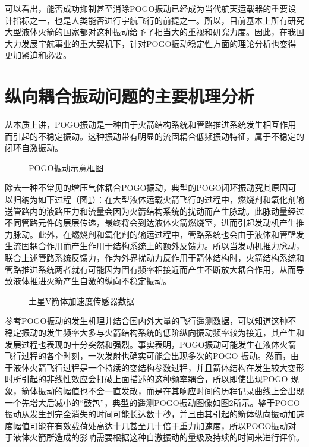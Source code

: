 可以看出，能否成功抑制甚至消除POGO振动已经成为当代航天运载器的重要设计指标之一，也是人类能否进行宇航飞行的前提之一。所以，目前基本上所有研究大型液体火箭的国家都对这种振动给予了相当大的重视和研究力度。因此，在我国大力发展宇航事业的重大契机下，针对POGO振动稳定性方面的理论分析也变得更加紧迫和必要。

\section{纵向耦合振动问题的主要机理分析}
\label{sec:POGO_Mechanicsm}
从本质上讲，POGO振动是一种由于火箭结构系统和管路推进系统发生相互作用而引起的不稳定振动。这种振动带有明显的流固耦合低频振动特征，属于不稳定的闭环自激振动\cite{Rubin:1973, Doiron:1977, Huang-Huaide:1987}。

\begin{figure}[h]
  \centering
  \caption{POGO振动示意框图}\label{Interaction-Diagram}
\end{figure}

除去一种不常见的增压气体耦合POGO振动\cite{Rubin:1970}，典型的POGO闭环振动究其原因可以归纳为如下过程（图\ref{Interaction-Diagram}）：在大型液体运载火箭飞行的过程中，燃烧剂和氧化剂输送管路内的液路压力和流量会因为火箭结构系统的扰动而产生脉动。此脉动量经过不同管路元件的层层传递，最终将会到达液体火箭燃烧室，进而引起发动机产生推力脉动。此外，在燃烧剂和氧化剂的输运过程中，管路系统也会由于液体和管壁发生流固耦合作用而产生作用于结构系统上的额外反馈力\cite{About:1987, Paidoussis:1993}。所以当发动机推力脉动，联合上述管路系统反馈力，作为外界扰动力反作用于箭体结构时，火箭结构系统和管路推进系统两者就有可能因为固有频率相接近而产生不断放大耦合作用，从而导致液体推进火箭产生自激的纵向不稳定振动\cite{Rubin:1970, Oppenheim:1993}。

\begin{figure}[!htb]
  \centering
  \caption{土星V箭体加速度传感器数据}\label{telemetry-typical}
\end{figure}

参考POGO振动的发生机理并结合国内外大量的飞行遥测数据\cite{Feng-Zhenxing:1981}，可以知道这种不稳定振动的发生频率大多与火箭结构系统的低阶纵向振动频率较为接近，其产生和发展过程也表现的十分突然和强烈。事实表明，POGO振动可能发生在液体火箭飞行过程的各个时刻，一次发射也确实可能会出现多次的POGO 振动\cite{Larsen:2008}。然而，由于液体火箭飞行过程是一个持续的变结构参数过程，并且箭体结构在发生较大变形时所引起的非线性效应会打破上面描述的这种频率耦合，所以即使出现POGO 现象，箭体振动的幅值也不会一直发散，而是在其响应时间的历程记录曲线上会出现一个先增大后减小的“鼓包”，典型的遥测POGO振动图像如图\ref{telemetry-typical}所示。鉴于POGO振动从发生到完全消失的时间可能长达数十秒，并且由其引起的箭体纵向振动加速度幅值可能在有效载荷处高达十几甚至几十倍于重力加速度，所以POGO振动对于液体火箭所造成的影响需要根据这种自激振动的量级及持续的时间来进行评价\cite{Wang-Qizheng:1999}。



